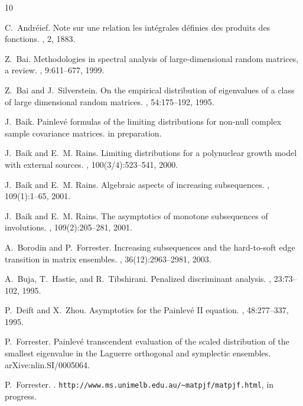 \documentclass[11pt]{article}
\begin{document}
\begin{thebibliography}{10}

C.~Andr\'eief.
\newblock Note sur une relation les int{\'e}grales d{\'e}finies des produits
  des fonctions.
, 2, 1883.

Z.~Bai.
\newblock Methodologies in spectral analysis of large-dimensional random
  matrices, a review.
, 9:611--677, 1999.

Z.~Bai and J.~Silverstein.
\newblock On the empirical distribution of eigenvalues of a class of large
  dimensional random matrices.
, 54:175--192, 1995.

J.~Baik.
\newblock Painlev{\'e} formulas of the limiting distributions for non-null
  complex sample covariance matrices.
\newblock in preparation.

J.~Baik and E.~M. Rains.
\newblock Limiting distributions for a polynuclear growth model with external
  sources.
, 100(3/4):523--541, 2000.

J.~Baik and E.~M. Rains.
\newblock Algebraic aspects of increasing subsequences.
, 109(1):1--65, 2001.

J.~Baik and E.~M. Rains.
\newblock The asymptotics of monotone subsequences of involutions.
, 109(2):205--281, 2001.

A.~Borodin and P.~Forrester.
\newblock Increasing subsequences and the hard-to-soft edge transition in
  matrix ensembles.
, 36(12):2963--2981, 2003.

A.~Buja, T.~Hastie, and R.~Tibshirani.
\newblock Penalized discriminant analysis.
, 23:73--102, 1995.

P.~Deift and X.~Zhou.
\newblock Asymptotics for the {P}ainlev{\'e} {II} equation.
, 48:277--337, 1995.

P.~Forrester.
\newblock Painlev{\'e} transcendent evaluation of the scaled distribution of
  the smallest eigenvalue in the {L}aguerre orthogonal and symplectic
  ensembles.
\newblock arXive:nlin.SI/0005064.

P.~Forrester.
.
\newblock \verb+http://www.ms.unimelb.edu.au/~matpjf/matpjf.html+, in progress.


\end{thebibliography}
\end{document}
